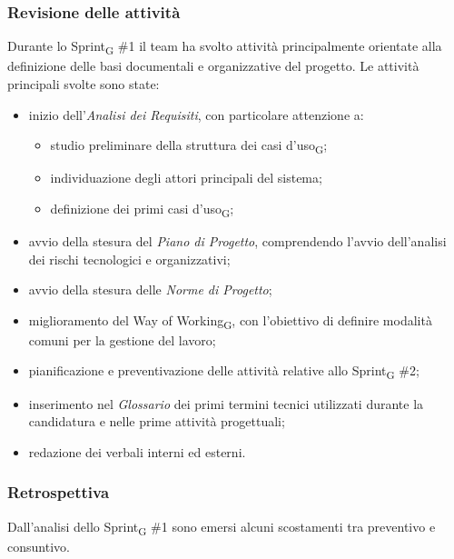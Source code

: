 ﻿\documentclass[a4paper, 10pt, colorlinks=true, linkcolor=black, urlcolor=blue, citecolor=blue, hidelinks]{article}
\begin{document}
\subsubsection{Revisione delle attività} 
Durante lo Sprint\textsubscript{G} \#1 il team ha svolto attività principalmente orientate alla definizione delle basi documentali e organizzative del progetto.
Le attività principali svolte sono state:
\begin{itemize}
    \item inizio dell'\textit{Analisi dei Requisiti}, con particolare attenzione a:
    \begin{itemize}
        \item studio preliminare della struttura dei casi d'uso\textsubscript{G};
        \item individuazione degli attori principali del sistema;
        \item definizione dei primi casi d'uso\textsubscript{G}; 
    \end{itemize} 
    \item avvio della stesura del \textit{Piano di Progetto}, comprendendo l'avvio dell'analisi dei rischi tecnologici e organizzativi;
    \item avvio della stesura delle \textit{Norme di Progetto};
    \item miglioramento del Way of Working\textsubscript{G}, con l'obiettivo di definire modalità comuni per la gestione del lavoro;      
    \item pianificazione e preventivazione delle attività relative allo Sprint\textsubscript{G} \#2;
    \item inserimento nel \textit{Glossario} dei primi termini tecnici utilizzati durante la candidatura e nelle prime attività progettuali;
    \item redazione dei verbali interni ed esterni.
\end{itemize}

\subsubsection{Retrospettiva}
Dall'analisi dello Sprint\textsubscript{G} \#1 sono emersi alcuni scostamenti tra preventivo e consuntivo.
\end{document}

